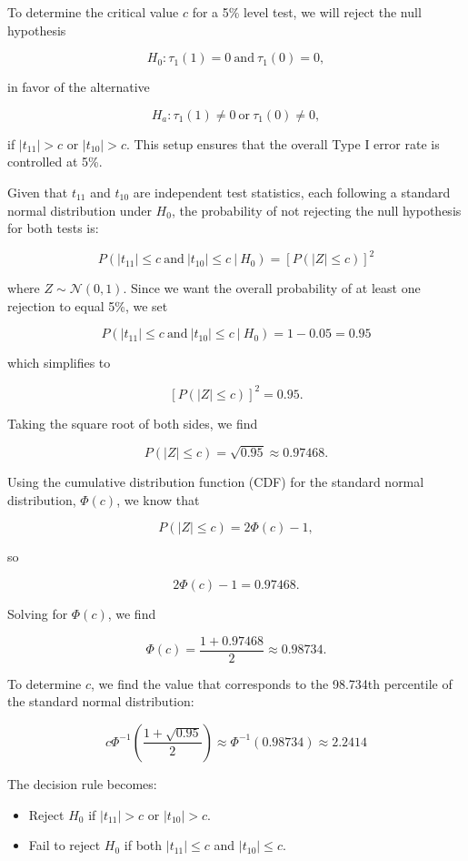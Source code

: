 \documentclass{article}
\begin{document}
To determine the critical value \( c \) for a 5\% level test, we will reject the null hypothesis

\[
H_0 : \tau_1(1) = 0 \ \text{and} \ \tau_1(0) = 0,
\]

in favor of the alternative

\[
H_a : \tau_1(1) \neq 0 \ \text{or} \ \tau_1(0) \neq 0,
\]

if \( |t_{11}| > c \) or \( |t_{10}| > c \). This setup ensures that the overall Type I error rate is controlled at 5\%.

Given that \( t_{11} \) and \( t_{10} \) are independent test statistics, each following a standard normal distribution under \( H_0 \), the probability of not rejecting the null hypothesis for both tests is:

\[
P\left( |t_{11}| \leq c \ \text{and} \ |t_{10}| \leq c \ \big| \ H_0 \right) = \left[ P\left( |Z| \leq c \right) \right]^2
\]

where \( Z \sim \mathcal{N}(0,1) \). Since we want the overall probability of at least one rejection to equal 5\%, we set

\[
P\left( |t_{11}| \leq c \ \text{and} \ |t_{10}| \leq c \ \big| \ H_0 \right) = 1 - 0.05 = 0.95
\]

which simplifies to

\[
\left[ P\left( |Z| \leq c \right) \right]^2 = 0.95.
\]

Taking the square root of both sides, we find

\[
P\left( |Z| \leq c \right) = \sqrt{0.95} \approx 0.97468.
\]

Using the cumulative distribution function (CDF) for the standard normal distribution, \( \Phi(c) \), we know that

\[
P\left( |Z| \leq c \right) = 2\Phi(c) - 1,
\]

so

\[
2\Phi(c) - 1 = 0.97468.
\]

Solving for \( \Phi(c) \), we find

\[
\Phi(c) = \frac{1 + 0.97468}{2} \approx 0.98734.
\]

To determine \( c \), we find the value that corresponds to the 98.734th percentile of the standard normal distribution:

\[
c \Phi^{-1}\left( \frac{1 + \sqrt{0.95}}{2} \right) \approx \Phi^{-1}(0.98734) \approx 2.2414
\]

The decision rule becomes:
\begin{itemize}
    \item Reject \( H_0 \) if \( |t_{11}| > c \) or \( |t_{10}| > c \).
    \item Fail to reject \( H_0 \) if both \( |t_{11}| \leq c \) and \( |t_{10}| \leq c \).
\end{itemize}
\end{document}
